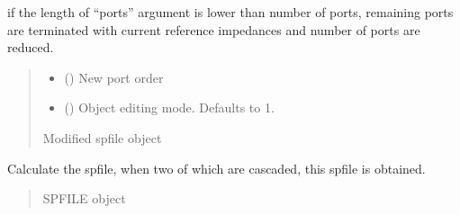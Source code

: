 \documentclass[letterpaper,10pt,english]{sphinxmanual}
\begin{document}
\begin{fulllineitems}
\begin{fulllineitems}
\sphinxAtStartPar
if the length of “ports” argument is lower than number of ports, remaining ports are terminated with current reference impedances and number of ports are reduced.
\begin{quote}\begin{description}
\begin{itemize}
\item {} 
\sphinxAtStartPar
{} () \textendash{} New port order

\item {} 
\sphinxAtStartPar
{} (\sphinxstyleliteralemphasis{\sphinxupquote{, }}) \textendash{} Object editing mode. Defaults to \sphinxhyphen{}1.

\end{itemize}

\sphinxAtStartPar
Modified spfile object

\sphinxAtStartPar
{\hyperref[\detokenize{touchstone:touchstone.spfile}]{}}

\end{description}\end{quote}

\end{fulllineitems}


\begin{fulllineitems}
\label{\detokenize{touchstone:touchstone.spfile.sqrt_network}}
\pysigstartsignatures
{}
\pysigstopsignatures
\sphinxAtStartPar
Calculate the spfile, when two of which are cascaded, this spfile is obtained.
\begin{quote}\begin{description}
\sphinxAtStartPar
SPFILE object

\sphinxAtStartPar
{\hyperref[\detokenize{touchstone:touchstone.spfile}]{}}

\end{description}\end{quote}


\end{fulllineitems}
\end{fulllineitems}
\end{document}
